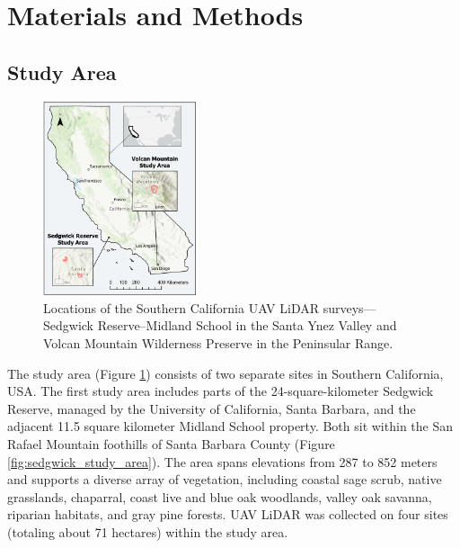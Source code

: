 \documentclass[preprint,12pt,authoryear]{elsarticle}
\begin{document}
\newpage

\section{Materials and Methods}


\subsection{Study Area}


\begin{figure}
  \centering
  \includegraphics[width=0.4\textwidth]{manuscript/figures/Overall_Study_Areas_v2.png}
  \caption{Locations of the Southern California UAV LiDAR surveys—Sedgwick Reserve–Midland School in the Santa Ynez Valley and Volcan Mountain Wilderness Preserve in the Peninsular Range.} 
  \label{fig:overall_study_area}
\end{figure}%

The study area (Figure \ref{fig:overall_study_area}) consists of two separate sites in Southern California, USA.
The first study area includes parts of the 24-square-kilometer Sedgwick Reserve, managed by the University of California, Santa Barbara, and the adjacent 11.5 square kilometer Midland School property. Both sit within the San Rafael Mountain foothills of Santa Barbara County (Figure \ref{fig:sedgwick_study_area}). The area spans elevations from 287 to 852 meters and supports a diverse array of vegetation, including coastal sage scrub, native grasslands, chaparral, coast live and blue oak woodlands, valley oak savanna, riparian habitats, and gray pine forests. UAV LiDAR was collected on four sites (totaling about 71 hectares) within the study area.
\FloatBarrier
\end{document}
